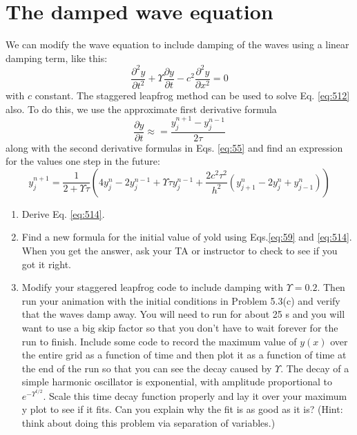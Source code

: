 \section*{The damped wave equation}
We can modify the wave equation to include damping of the waves using a linear
damping term, like this:
\begin{equation}\label{eq:512}
\frac{\partial^2 y}{\partial t^2} + \Upsilon \frac{\partial y}{\partial t} - c^2 \frac{\partial^2 y}{\partial x^2} = 0
\end{equation}
with $c$ constant. The staggered leapfrog method can be used to solve Eq. \eqref{eq:512}
also. To do this, we use the approximate first derivative formula
\begin{equation}\label{eq:513}
\frac{\partial y}{\partial t } \approx = \frac{y_j^{n+1} - y_j^{n-1}}{2 \tau}
\end{equation}
along with the second derivative formulas in Eqs. \eqref{eq:55} and find an expression for
the values one step in the future:
\begin{equation}\label{eq:514}
y^{n+1}_j = \frac{1}{2+ \Upsilon \tau}(4y^n_j-2y^{n-1}_j+ \Upsilon \tau y^{n-1}_j + \frac{2c^2 \tau^2}{h^2}(y^n_{j+1} - 2y^n_j + y^n_{j-1}))
\end{equation}
\begin{problem}\label{P5.4} 
\begin{enumerate}[label=(\alph*)]
	\item Derive Eq. \eqref{eq:514}.
	\item Find a new formula for the initial value of yold using Eqs.\eqref{eq:59} and
\eqref{eq:514}. When you get the answer, ask your TA or instructor to check to
see if you got it right.
\item Modify your staggered leapfrog code to include damping with $ \Upsilon = 0.2$.
Then run your animation with the initial conditions in Problem 5.3(c)
and verify that the waves damp away. You will need to run for about
25 s and you will want to use a big skip factor so that you don\rq t have
to wait forever for the run to finish. Include some code to record the
maximum value of $y(x)$ over the entire grid as a function of time and
then plot it as a function of time at the end of the run so that you can
see the decay caused by $\Upsilon$. The decay of a simple harmonic oscillator
is exponential, with amplitude proportional to $e^{−\Upsilon^{ t/2}}$. Scale this time
decay function properly and lay it over your maximum y plot to see if
it fits. Can you explain why the fit is as good as it is? (Hint: think about
doing this problem via separation of variables.)

\end{enumerate}
\end{problem}
